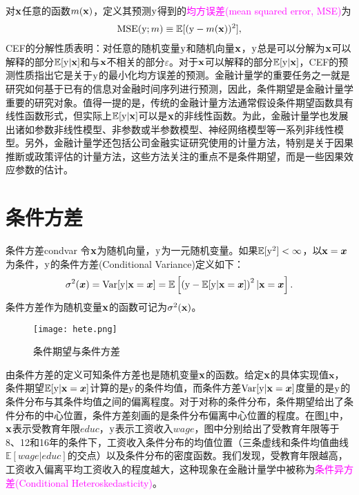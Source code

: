\documentclass[cn,11pt,chinese]{elegantbook}
\begin{document}
对$\bold{x}$任意的函数$m(\bold{x})$，定义其预测$\rm{y}$得到的\textcolor{magenta}{均方误差(mean squared error, MSE)}为
\begin{eqnarray*}
	{\rm{MSE}}({\rm{y}};m)\equiv\mathbb{E}[({\rm{y}}-m(\bold{x}))^{2}],
\end{eqnarray*}
CEF的分解性质表明：对任意的随机变量$\rm{y}$和随机向量$\bold{x}$，$\rm{y}$总是可以分解为$\bold{x}$可以解释的部分$\mathbb{E}[{\rm{y}}|\bold{x}]$和与$\bold{x}$不相关的部分$\varepsilon$。对于$\bold{x}$可以解释的部分$\mathbb{E}[{\rm{y}}|\bold{x}]$，CEF的预测性质指出它是关于$\rm{y}$的最小化均方误差的预测。金融计量学的重要任务之一就是研究如何基于已有的信息对金融时间序列进行预测，因此，条件期望是金融计量学重要的研究对象。值得一提的是，传统的金融计量方法通常假设条件期望函数具有线性函数形式，但实际上$\mathbb{E}[{\rm{y}}|\bold{x}]$可以是$\bold{x}$的非线性函数。为此，金融计量学也发展出诸如参数非线性模型、非参数或半参数模型、神经网络模型等一系列非线性模型。另外，金融计量学还包括公司金融实证研究使用的计量方法，特别是关于因果推断或政策评估的计量方法，这些方法关注的重点不是条件期望，而是一些因果效应参数的估计。
\section{条件方差}
\begin{definition}{条件方差}{condvar}
令$\bold{x}$为随机向量，$\rm{y}$为一元随机变量。如果$\mathbb{E}[\rm{y}^2]<\infty$，以$\bold{x}=\boldsymbol{x}$为条件，$\rm{y}$的条件方差(Conditional Variance)定义如下：
	\begin{eqnarray*}
		\sigma^{2}(\boldsymbol{x})={\mathrm{Var}}[{\rm{y}}|\bold{x}=\boldsymbol{x}]=\mathbb{E}\left[\left({\rm{y}}-\mathbb{E}[\rm{y}|\bold{x}=\boldsymbol{x}]\right)^{2}|\bold{x}=\boldsymbol{x}\right].
	\end{eqnarray*}
	条件方差作为随机变量$\bold{x}$的函数可记为$\sigma^{2}(\bold{x})$。
\end{definition}
\begin{figure}[h]
  \centering
  \texttt{[image: hete.png]}
  \caption{条件期望与条件方差}\label{fig1}
\end{figure}
由条件方差的定义可知条件方差也是随机变量$\bold{x}$的函数。给定$\bold{x}$的具体实现值$\boldsymbol{x}$，条件期望$\mathbb{E}[\rm{y}|\bold{x}=\boldsymbol{x}]$计算的是$\rm{y}$的条件均值，而条件方差$\mathrm{Var}[\rm{y}|\bold{x}=\boldsymbol{x}]$度量的是$\rm{y}$的条件分布与其条件均值之间的偏离程度。对于对称的条件分布，条件期望给出了条件分布的中心位置，条件方差刻画的是条件分布偏离中心位置的程度。在图\ref{fig1}中，$\bold{x}$表示受教育年限$educ$，$\rm{y}$表示工资收入$wage$，图中分别给出了受教育年限等于8、12和16年的条件下，工资收入条件分布的均值位置（三条虚线和条件均值曲线$\mathbb{E}[wage|educ]$的交点）以及条件分布的密度函数。我们发现，受教育年限越高，工资收入偏离平均工资收入的程度越大，这种现象在金融计量学中被称为\textcolor{magenta}{条件异方差(Conditional Heteroskedasticity)}。
\end{document}
